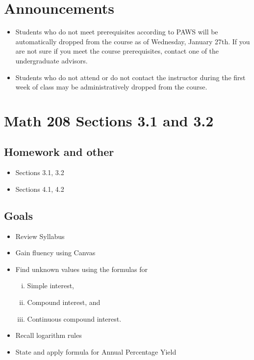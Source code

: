 \documentclass[14pt]{extarticle}
\begin{document}
	
\section*{Announcements}
\begin{itemize}
	\item Students who do not meet prerequisites according to PAWS will be automatically dropped from the course as of Wednesday, January 27th. If you are not sure if you meet the course prerequisites, contact one of the
	undergraduate advisors.
	\item Students who do not attend or do not contact the instructor during the first week of class may be administratively dropped from the course.
\end{itemize}


\section*{Math 208 Sections 3.1 and 3.2}

\subsection{Homework and other}
\begin{itemize}
\item Sections 3.1, 3.2
\item Sections 4.1, 4.2
\end{itemize}

\subsection{Goals}

\begin{itemize}
	\item Review Syllabus
	\item Gain fluency using Canvas
	\item Find unknown values using the formulas for 
	\begin{enumerate}[(i)]
		\item Simple interest,
		\item Compound interest, and
		\item Continuous compound interest.
	\end{enumerate}
	\item Recall logarithm rules
	\item State and apply formula for Annual Percentage Yield
\end{itemize}
\end{document}
